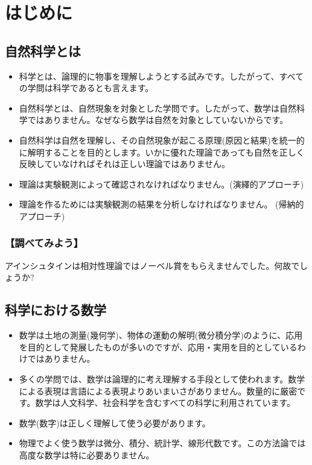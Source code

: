 %
%


\section{はじめに}

\subsection{自然科学とは}

\begin{itemize}

\item 科学とは、論理的に物事を理解しようとする試みです。したがって、すべての学問は科学であるとも言えます。

\item 自然科学とは、自然現象を対象とした学問です。したがって、数学は自然科学ではありません。なぜなら数学は自然を対象としていないからです。

\item 自然科学は自然を理解し、その自然現象が起こる原理(原因と結果)を統一的に解明することを目的とします。いかに優れた理論であっても自然を正しく反映していなければそれは正しい理論ではありません。

\item 理論は実験観測によって確認されなければなりません。(演繹的アプローチ)

\item 理論を作るためには実験観測の結果を分析しなければなりません。 (帰納的アプローチ)

\end{itemize}

\subsubsection*{【調べてみよう】}

アインシュタインは相対性理論ではノーベル賞をもらえませんでした。何故でしょうか?

\subsection{科学における数学}

\begin{itemize}

\item 数学は土地の測量(幾何学)、物体の運動の解明(微分積分学)のように、応用を目的として発展したものが多いのですが、応用・実用を目的としているわけではありません。

\item 多くの学問では、数学は論理的に考え理解する手段として使われます。数学による表現は言語による表現よりあいまいさがありません。数量的に厳密です。数学は人文科学、社会科学を含むすべての科学に利用されています。

\item 数学(数字)は正しく理解して使う必要があります。

\item 物理でよく使う数学は微分、積分、統計学、線形代数です。この方法論では高度な数学は特に必要ありません。

\end{itemize}


